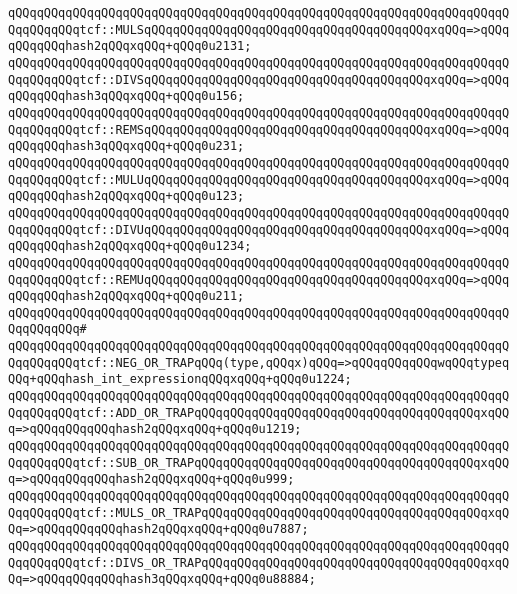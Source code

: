 \verb|qQQqqQQqqQQqqQQqqQQqqQQqqQQqqQQqqQQqqQQqqQQqqQQqqQQqqQQqqQQqqQQqqQQqqQQqqQQqqQQqtcf::MULSqQQqqQQqqQQqqQQqqQQqqQQqqQQqqQQqqQQqqQQqxqQQq=>qQQqqQQqqQQqhash2qQQqxqQQq+qQQq0u2131;|\newline
\verb|qQQqqQQqqQQqqQQqqQQqqQQqqQQqqQQqqQQqqQQqqQQqqQQqqQQqqQQqqQQqqQQqqQQqqQQqqQQqqQQqtcf::DIVSqQQqqQQqqQQqqQQqqQQqqQQqqQQqqQQqqQQqqQQqxqQQq=>qQQqqQQqqQQqhash3qQQqxqQQq+qQQq0u156;|\newline
\verb|qQQqqQQqqQQqqQQqqQQqqQQqqQQqqQQqqQQqqQQqqQQqqQQqqQQqqQQqqQQqqQQqqQQqqQQqqQQqqQQqtcf::REMSqQQqqQQqqQQqqQQqqQQqqQQqqQQqqQQqqQQqqQQqxqQQq=>qQQqqQQqqQQqhash3qQQqxqQQq+qQQq0u231;|\newline
\verb|qQQqqQQqqQQqqQQqqQQqqQQqqQQqqQQqqQQqqQQqqQQqqQQqqQQqqQQqqQQqqQQqqQQqqQQqqQQqqQQqtcf::MULUqQQqqQQqqQQqqQQqqQQqqQQqqQQqqQQqqQQqqQQqxqQQq=>qQQqqQQqqQQqhash2qQQqxqQQq+qQQq0u123;|\newline
\verb|qQQqqQQqqQQqqQQqqQQqqQQqqQQqqQQqqQQqqQQqqQQqqQQqqQQqqQQqqQQqqQQqqQQqqQQqqQQqqQQqtcf::DIVUqQQqqQQqqQQqqQQqqQQqqQQqqQQqqQQqqQQqqQQqxqQQq=>qQQqqQQqqQQqhash2qQQqxqQQq+qQQq0u1234;|\newline
\verb|qQQqqQQqqQQqqQQqqQQqqQQqqQQqqQQqqQQqqQQqqQQqqQQqqQQqqQQqqQQqqQQqqQQqqQQqqQQqqQQqtcf::REMUqQQqqQQqqQQqqQQqqQQqqQQqqQQqqQQqqQQqqQQqxqQQq=>qQQqqQQqqQQqhash2qQQqxqQQq+qQQq0u211;|\newline
\verb|qQQqqQQqqQQqqQQqqQQqqQQqqQQqqQQqqQQqqQQqqQQqqQQqqQQqqQQqqQQqqQQqqQQqqQQqqQQqqQQq#|\newline
\verb|qQQqqQQqqQQqqQQqqQQqqQQqqQQqqQQqqQQqqQQqqQQqqQQqqQQqqQQqqQQqqQQqqQQqqQQqqQQqqQQqtcf::NEG_OR_TRAPqQQq(type,qQQqx)qQQq=>qQQqqQQqqQQqwqQQqtypeqQQq+qQQqhash_int_expressionqQQqxqQQq+qQQq0u1224;|\newline
\verb|qQQqqQQqqQQqqQQqqQQqqQQqqQQqqQQqqQQqqQQqqQQqqQQqqQQqqQQqqQQqqQQqqQQqqQQqqQQqqQQqtcf::ADD_OR_TRAPqQQqqQQqqQQqqQQqqQQqqQQqqQQqqQQqqQQqqQQqxqQQq=>qQQqqQQqqQQqhash2qQQqxqQQq+qQQq0u1219;|\newline
\verb|qQQqqQQqqQQqqQQqqQQqqQQqqQQqqQQqqQQqqQQqqQQqqQQqqQQqqQQqqQQqqQQqqQQqqQQqqQQqqQQqtcf::SUB_OR_TRAPqQQqqQQqqQQqqQQqqQQqqQQqqQQqqQQqqQQqqQQqxqQQq=>qQQqqQQqqQQqhash2qQQqxqQQq+qQQq0u999;|\newline
\verb|qQQqqQQqqQQqqQQqqQQqqQQqqQQqqQQqqQQqqQQqqQQqqQQqqQQqqQQqqQQqqQQqqQQqqQQqqQQqqQQqtcf::MULS_OR_TRAPqQQqqQQqqQQqqQQqqQQqqQQqqQQqqQQqqQQqqQQqxqQQq=>qQQqqQQqqQQqhash2qQQqxqQQq+qQQq0u7887;|\newline
\verb|qQQqqQQqqQQqqQQqqQQqqQQqqQQqqQQqqQQqqQQqqQQqqQQqqQQqqQQqqQQqqQQqqQQqqQQqqQQqqQQqtcf::DIVS_OR_TRAPqQQqqQQqqQQqqQQqqQQqqQQqqQQqqQQqqQQqqQQqxqQQq=>qQQqqQQqqQQqhash3qQQqxqQQq+qQQq0u88884;|\newline
